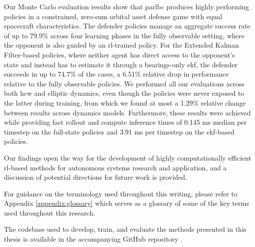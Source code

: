 Our Monte Carlo evaluation results show that \acs{parlbc} produces highly performing policies in a constrained, zero-sum orbital asset defense game with equal spacecraft characteristics. The defender policies manage an aggregate success rate of up to 79.9\% across four learning phases in the fully observable setting, where the opponent is also guided by an \acs{rl}-trained policy. For the Extended Kalman Filter-based policies, where neither agent has direct access to the opponent's state and instead has to estimate it through a bearings-only \acs{ekf}, the defender succeeds in up to 74.7\% of the cases, a 6.51\% relative drop in performance relative to the fully observable policies. We performed all our evaluations across both \acs{hcw} and elliptic dynamics, even though the policies were never exposed to the latter during training, from which we found at most a 1.29\% relative change between results across dynamics models. Furthermore, these results were achieved while providing fast rollout and compute inference times of 0.145 ms median per timestep on the full-state policies and 3.91 ms per timestep on the \acs{ekf}-based policies.

Our findings open the way for the development of highly computationally efficient \acs{rl}-based methods for autonomous systems research and application, and a discussion of potential directions for future work is provided.

For guidance on the terminology used throughout this writing, please refer to Appendix \ref{appendix:glossary} which serves as a glossary of some of the key terms used throughout this research.


The codebase used to develop, train, and evaluate the methods presented in this thesis is available in the accompanying GitHub repository \cite{researchrepo}.